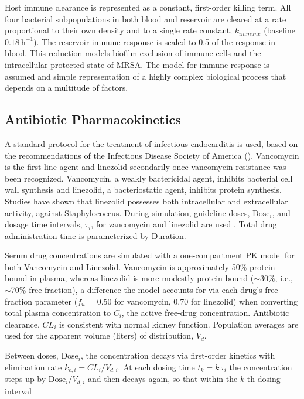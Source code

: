 \documentclass[12pt, draftcls, onecolumn]{IEEEtran}
\begin{document}
Host immune clearance is represented as a constant, first-order killing
term. All four bacterial subpopulations in both blood and
reservoir are cleared at a rate proportional to their own density and to
a single rate constant, $k_{immune}$ (baseline $0.18~\mathrm{h^{-1}}$).
The reservoir immune response is scaled to 0.5 of the response in blood. This
reduction models biofilm exclusion of immune cells and the intracellular protected state of MRSA.
The model for immune response is assumed and simple representation
of a highly complex biological process that depends on a multitude of factors.


\subsection{Antibiotic Pharmacokinetics}
A standard protocol for the treatment of infectious endocarditis is used, based on the recommendations
of the Infectious Disease Society of America (\cite{Minter2023}).
Vancomycin is the first line agent and linezolid secondarily once vancomycin resistance was been recognized.
Vancomycin, a weakly bactericidal agent, inhibits bacterial cell wall synthesis and linezolid, a bacteriostatic agent,
inhibits protein synthesis. Studies have shown that linezolid possesses both intracellular and extracellular activity, against Staphylococcus\cite{sandberg2010intra}.
During simulation, guideline doses, $\mathrm{Dose}_{i}$, and dosage time intervals, $\tau_{i}$, for vancomycin and linezolid are used \cite{vancopk_review}.  Total drug administration time is parameterized by Duration. 

Serum drug concentrations are simulated with a one-compartment PK model for both Vancomycin and Linezolid.
Vancomycin is approximately 50\% protein-bound in plasma, whereas linezolid is more modestly protein-bound ($\sim$30\%, i.e., $\sim$70\% free fraction), a difference the model accounts for via each drug's free-fraction parameter ($f_u$ = 0.50 for vancomycin, 0.70 for linezolid) when converting total plasma concentration to $C_{i}$, the active free-drug concentration.  Antibiotic clearance, $CL_{i}$ is consistent with normal kidney function. Population averages are used for the apparent volume (liters) of distribution, $V_{d}$. 


Between doses, $\mathrm{Dose}_{i}$, the concentration decays via first-order kinetics with elimination rate $k_{e,i} = CL_i / V_{d,i}$. At each dosing time $t_k = k\,\tau_i$ the concentration steps up by $\mathrm{Dose}_i / V_{d,i}$ and then decays again,
so that within the $k$-th dosing interval
\end{document}

